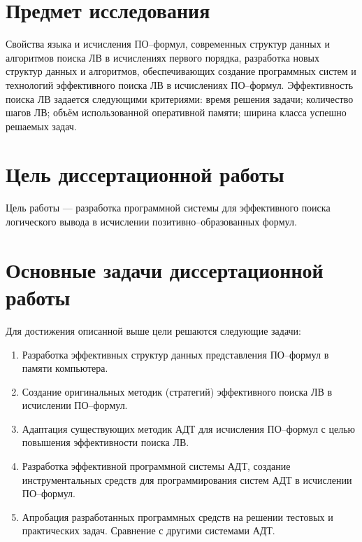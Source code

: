 \section*{Предмет исследования}
Свойства языка и исчисления ПО--формул, современных структур данных и алгоритмов поиска ЛВ в исчислениях первого порядка, разработка новых структур данных и алгоритмов, обеспечивающих создание программных систем и технологий эффективного поиска ЛВ в исчислениях ПО--формул. Эффективность поиска ЛВ задается следующими критериями: время решения задачи; количество шагов ЛВ; объём использованной оперативной памяти; ширина класса успешно решаемых задач.




\section*{Цель диссертационной работы}
Цель работы --- разработка программной системы для эффективного поиска логического вывода в исчислении позитивно--образованных формул.


\section*{Основные задачи диссертационной работы}
Для достижения описанной выше цели решаются следующие задачи:
\begin{enumerate}
\item Разработка эффективных структур данных представления ПО--формул в памяти компьютера.
\item Создание оригинальных методик (стратегий) эффективного поиска ЛВ в исчислении ПО--формул.
\item Адаптация существующих методик АДТ для исчисления ПО--формул с целью повышения эффективности поиска ЛВ.
\item Разработка эффективной программной системы АДТ, создание инструментальных средств для программирования систем АДТ в исчислении ПО--формул.
\item Апробация разработанных программных средств на решении тестовых и практических задач. Сравнение с другими системами АДТ.
\end{enumerate}


